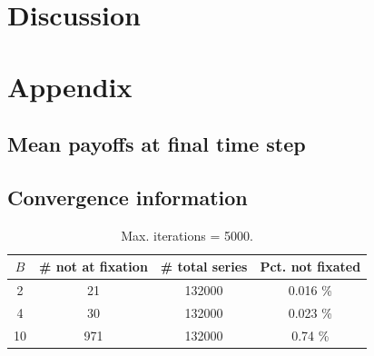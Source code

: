 \documentclass[letterpaper,11.5pt]{scrartcl}
\begin{document}

    




\section{Discussion}




\setlength{\bibleftmargin}{.125in}
\setlength{\bibindent}{-\bibleftmargin}

% 



\appendix

\section{Appendix}

\subsection{Mean payoffs at final time step}




\subsection{Convergence information}

\begin{table}[h]
  \caption{Max. iterations = 5000.}
  \centering
  \begin{tabular}{cccc} \toprule
    $B$ & \# not at fixation & \# total series & Pct. not fixated \\
    \midrule  
    2  & 21  & 132000 & 0.016 \% \\
    4  & 30  & 132000 & 0.023 \% \\
    10 & 971 & 132000 & 0.74  \% \\
    \bottomrule
  \end{tabular} 
\end{table}
\end{document}
